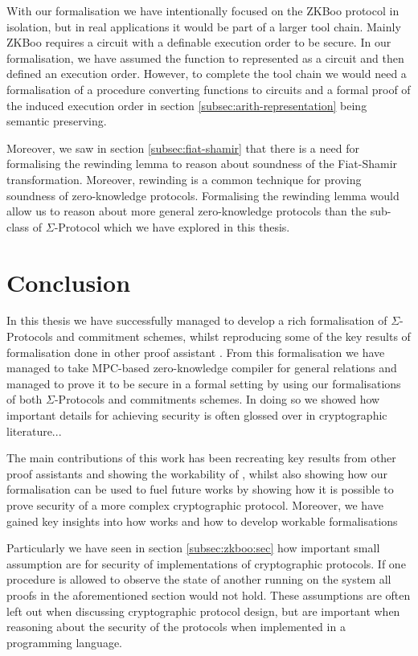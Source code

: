 With our formalisation we have intentionally focused on the ZKBoo protocol in
isolation, but in real applications it would be part of a larger tool chain.
Mainly ZKBoo requires a circuit with a definable execution order to be secure.
In our formalisation, we have assumed the function to represented as a circuit
and then defined an execution order. However, to complete the tool chain we would need a formalisation of
a procedure converting functions to circuits and a formal proof of the induced
execution order in section \ref{subsec:arith-representation} being semantic preserving.

Moreover, we saw in section \ref{subsec:fiat-shamir} that there is a need for
formalising the rewinding lemma to reason about soundness of the Fiat-Shamir
transformation. Moreover, rewinding is a common technique for proving soundness
of zero-knowledge protocols. Formalising the rewinding lemma would allow
us to reason about more general zero-knowledge protocols than the sub-class of
$\Sigma$-Protocol which we have explored in this thesis.

\section{Conclusion}
\label{sec:conclusion}
\begin{draft}
In this thesis we have successfully managed to develop a rich formalisation of
$\Sigma$-Protocols and commitment schemes, whilst reproducing some of the key results of
formalisation done in other proof assistant \cite{cryptoeprint:2019:1185,certicrypt_sigma}.
From this formalisation we have managed to take MPC-based zero-knowledge
compiler for general relations and managed to prove it to be secure in a formal
setting by using our formalisations of both $\Sigma$-Protocols and commitments
schemes. In doing so we showed how important details for achieving security is
often glossed over in cryptographic literature...
\end{draft}

The main contributions of this work has been recreating key results from other
proof assistants and showing the workability of \easycrypt, whilst also showing
how our formalisation can be used to fuel future works by showing how it is
possible to prove security of a more complex cryptographic protocol.
Moreover, we have gained key insights into how \easycrypt works and how to
develop workable formalisations

Particularly we have seen in section \ref{subsec:zkboo:sec} how important small
assumption are for security of implementations of cryptographic protocols. If
one procedure is allowed to observe the state of another running on the system
all proofs in the aforementioned section would not hold. These assumptions are
often left out when discussing cryptographic protocol design, but are important
when reasoning about the security of the protocols when implemented in a
programming language.

